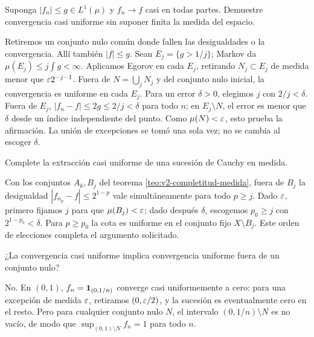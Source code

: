 \begin{ejercicio}\label{ej:v2-l14-4}
Suponga $|f_n|\le g\in L^1(\mu)$ y $f_n\to f$ casi en todas partes. Demuestre convergencia casi uniforme sin suponer finita la medida del espacio.
\end{ejercicio}
\begin{solucion}
Retiremos un conjunto nulo común donde fallen las desigualdades o la convergencia. Allí también $|f|\le g$. Sean $E_j=\{g>1/j\}$; Markov da $\mu(E_j)\le j\int g<\infty$. Aplicamos Egorov en cada $E_j$, retirando $N_j\subset E_j$ de medida menor que $\varepsilon2^{-j-1}$. Fuera de $N=\bigcup_jN_j$ y del conjunto nulo inicial, la convergencia es uniforme en cada $E_j$. Para un error $\delta>0$, elegimos $j$ con $2/j<\delta$. Fuera de $E_j$, $|f_n-f|\le2g\le2/j<\delta$ para todo $n$; en $E_j\setminus N$, el error es menor que $\delta$ desde un índice independiente del punto. Como $\mu(N)<\varepsilon$, esto prueba la afirmación. La unión de excepciones se tomó una sola vez; no se cambia al escoger $\delta$.
\end{solucion}

\begin{ejercicio}\label{ej:v2-l15-1}
Complete la extracción casi uniforme de una sucesión de Cauchy en medida.
\end{ejercicio}
\begin{solucion}
Con los conjuntos $A_k,B_j$ del teorema \ref{teo:v2-completitud-medida}, fuera de $B_j$ la desigualdad $|f_{n_p}-f|\le2^{1-p}$ vale simultáneamente para todo $p\ge j$. Dado $\varepsilon$, primero fijamos $j$ para que $\mu(B_j)<\varepsilon$; dado después $\delta$, escogemos $p_0\ge j$ con $2^{1-p_0}<\delta$. Para $p\ge p_0$ la cota es uniforme en el conjunto fijo $X\setminus B_j$. Este orden de elecciones completa el argumento solicitado.
\end{solucion}

\begin{ejercicio}\label{ej:v2-l15-2}
¿La convergencia casi uniforme implica convergencia uniforme fuera de un conjunto nulo?
\end{ejercicio}
\begin{solucion}
No. En $(0,1)$, $f_n=\mathbf1_{(0,1/n)}$ converge casi uniformemente a cero: para una excepción de medida $\varepsilon$, retiramos $(0,\varepsilon/2)$, y la sucesión es eventualmente cero en el resto. Pero para cualquier conjunto nulo $N$, el intervalo $(0,1/n)\setminus N$ es no vacío, de modo que $\sup_{(0,1)\setminus N}f_n=1$ para todo $n$.
\end{solucion}

